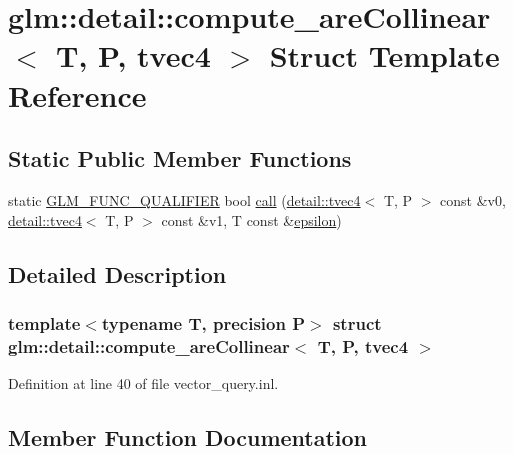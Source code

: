 \hypertarget{structglm_1_1detail_1_1compute__are_collinear_3_01_t_00_01_p_00_01tvec4_01_4}{}\section{glm\+:\+:detail\+:\+:compute\+\_\+are\+Collinear$<$ T, P, tvec4 $>$ Struct Template Reference}
\label{structglm_1_1detail_1_1compute__are_collinear_3_01_t_00_01_p_00_01tvec4_01_4}
\subsection*{Static Public Member Functions}
\begin{DoxyCompactItemize}
\item 
static \hyperlink{setup_8hpp_a33fdea6f91c5f834105f7415e2a64407}{G\+L\+M\+\_\+\+F\+U\+N\+C\+\_\+\+Q\+U\+A\+L\+I\+F\+I\+ER} bool \hyperlink{structglm_1_1detail_1_1compute__are_collinear_3_01_t_00_01_p_00_01tvec4_01_4_a4a7e3fba780b73ef237fbf76dc6ead91}{call} (\hyperlink{structglm_1_1detail_1_1tvec4}{detail\+::tvec4}$<$ T, P $>$ const \&v0, \hyperlink{structglm_1_1detail_1_1tvec4}{detail\+::tvec4}$<$ T, P $>$ const \&v1, T const \&\hyperlink{group__gtc__constants_gacb41049b8d22c8aa90e362b96c524feb}{epsilon})
\end{DoxyCompactItemize}


\subsection{Detailed Description}
\subsubsection*{template$<$typename T, precision P$>$\newline
struct glm\+::detail\+::compute\+\_\+are\+Collinear$<$ T, P, tvec4 $>$}



Definition at line 40 of file vector\+\_\+query.\+inl.



\subsection{Member Function Documentation}
\mbox{\label{structglm_1_1detail_1_1compute__are_collinear_3_01_t_00_01_p_00_01tvec4_01_4_a4a7e3fba780b73ef237fbf76dc6ead91}} 
